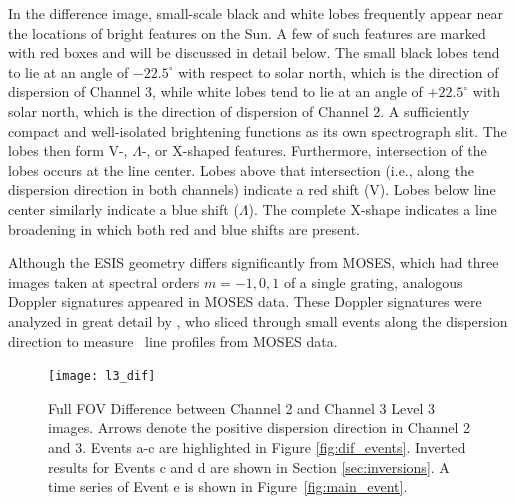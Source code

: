     	
    	In the difference image, small-scale black and white lobes frequently appear near the locations of bright features on the Sun. A few of such features are marked with red boxes and will be discussed in detail below.  
    	The small black lobes tend to lie at an angle of $-22.5^\circ$ with respect to solar north, which is the direction of dispersion of Channel 3, while white lobes tend to lie at an angle of $+22.5^\circ$ with solar north, which is the direction of dispersion of Channel 2. A sufficiently compact and well-isolated brightening functions as its own spectrograph slit. 
    	The lobes then form V-, $\Lambda$-, or X-shaped features. 
    	Furthermore, intersection of the lobes occurs at the line center. 
    	Lobes above that intersection (i.e., along the dispersion direction in both channels) indicate a red shift (V). 
    	Lobes below line center similarly indicate a blue shift ($\Lambda$). The complete X-shape indicates a line broadening in which both red and blue shifts are present.
    	
    	Although the ESIS geometry differs significantly from MOSES, which had three images taken at spectral orders $m=-1, 0, 1$
    	of a single grating, analogous Doppler signatures appeared in MOSES data. These Doppler signatures were analyzed in great detail by \citet{Rust2019}, who sliced through small events along the dispersion direction to measure \heii \ line profiles from MOSES data.
    	    
   		
  		\begin{figure}[htb!]
  			\centering
  			\texttt{[image: l3\_dif]}
  			\caption{Full FOV Difference between Channel 2 and Channel 3 Level 3 images.  
  			Arrows denote the positive dispersion direction in Channel 2 and 3.
  			Events a-c are highlighted in Figure \ref{fig:dif_events}.    
  			Inverted results for Events c and d are shown in Section \ref{sec:inversions}. 
  			A time series of Event e is shown in Figure~\ref{fig:main_event}.}
  			\label{fig:l3_dif}
  		\end{figure}
   	
